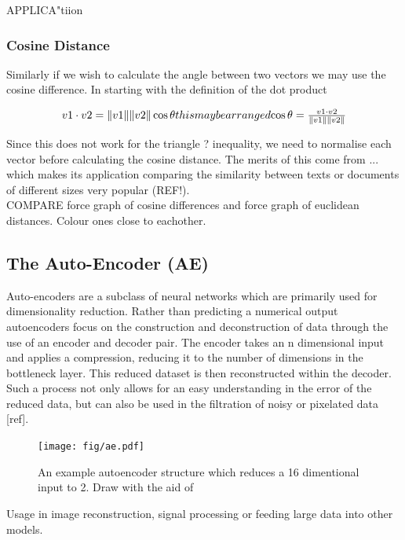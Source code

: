 \documentclass{pasa}%
\begin{document}
APPLICA"tiion

\subsubsection{Cosine Distance} 

Similarly if we wish to calculate the angle between two vectors we may use the cosine difference. In starting with the definition of the dot product 

\begin{equation}
v1 \cdot v2 = \|v1\|\|v2\| \cos \theta
$$this may be arranged$$
\cos \theta = \frac{ v1 \cdot v2}{\|v1\|\|v2\|}
\end{equation}

Since this does not work for the triangle ? inequality, we need to normalise each vector before calculating the cosine distance. The merits of this come from  ... which makes its application comparing the similarity between texts or documents of different sizes very popular (REF!). \\


COMPARE force graph of cosine differences and force graph of euclidean distances. Colour ones close to eachother. \\



\subsection{The Auto-Encoder (AE)}
Auto-encoders are a subclass of neural networks which are primarily used for dimensionality reduction. Rather than predicting a numerical output autoencoders focus on the construction and deconstruction of data through the use of an encoder and decoder pair. The encoder takes an n dimensional input and applies a compression, reducing it to the number of dimensions in the bottleneck layer. This reduced dataset is then reconstructed within the decoder. Such a process not only allows for an easy understanding in the error of the reduced data, but can also be used in the filtration of noisy or pixelated data [ref].\\ 


\begin{figure}[H]
\texttt{[image: fig/ae.pdf]}
\caption{An example autoencoder structure which reduces a 16 dimentional input to 2. Draw with the aid of \cite{drawae}}
\end{figure}


Usage in image reconstruction, signal processing or feeding large data into other models. \\
\end{document}
